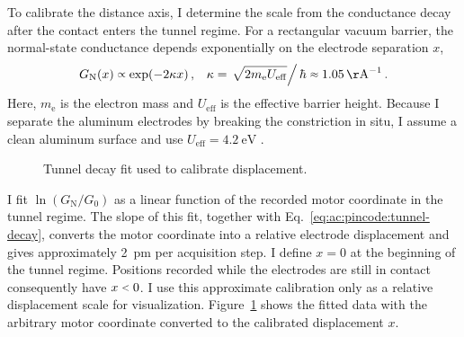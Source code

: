         To calibrate the distance axis, I determine the scale from the conductance decay after the contact enters the tunnel regime. For a rectangular vacuum barrier, the normal-state conductance depends exponentially on the electrode separation $x$,
        \begin{align}
            G_\mathrm{N}(x) \spropto \exp(-2\kappa x)\,, &&
            \kappa = \left. \sqrt{2m_\mathrm{e}U_\mathrm{eff}}\right/\hbar\sapprox 1.05\,\mathrm{Å}^{-1}\,.
            \label{eq:ac:pincode:tunnel-decay}
        \end{align}
        Here, $m_\mathrm{e}$ is the electron mass and $U_\mathrm{eff}$ is the effective barrier height. Because I separate the aluminum electrodes by breaking the constriction in situ, I assume a clean aluminum surface and use $U_\mathrm{eff}=\qty{4.2}{\electronvolt}$ \cite{grepstad_anisotropic_1976}.

        \begin{figure}
            \captionsetup{format=plain}%
            \centering
            \vspace{-1.0em}
            \caption{
                Tunnel decay fit used to calibrate displacement.
            }
            \label{fig:ac:pincode:tunneling}
        \end{figure}
        I fit $\ln\left(G_\mathrm{N}/G_0\right)$ as a linear function of the recorded motor coordinate in the tunnel regime. The slope of this fit, together with Eq.~\eqref{eq:ac:pincode:tunnel-decay}, converts the motor coordinate into a relative electrode displacement and gives approximately \qty{2}{\pico\meter} per acquisition step. I define $x=0$ at the beginning of the tunnel regime. Positions recorded while the electrodes are still in contact consequently have $x\slt{}0$. I use this approximate calibration only as a relative displacement scale for visualization. Figure~\ref{fig:ac:pincode:tunneling} shows the fitted data with the arbitrary motor coordinate converted to the calibrated displacement $x$.


